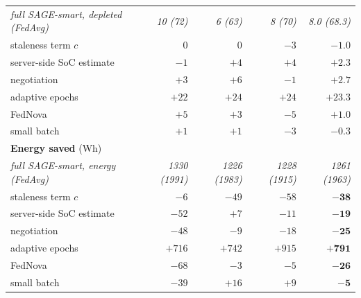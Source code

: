 \documentclass[11pt,a4paper]{article}
\begin{document}
\begin{table}[H]
\begin{tabular}{lrrrr}
\quad \emph{full SAGE-smart, depleted (FedAvg)} & \emph{10 (72)} & \emph{6 (63)} & \emph{8 (70)} & \emph{8.0 (68.3)} \\
\quad staleness term $c$        & $0$  & $0$  & $-3$  & $\mathbf{-1.0}$ \\
\quad server-side SoC estimate  & $-1$ & $+4$ & $+4$  & $\mathbf{+2.3}$ \\
\quad negotiation               & $+3$ & $+6$ & $-1$  & $\mathbf{+2.7}$ \\
\quad adaptive epochs           & $+22$ & $+24$ & $+24$ & $\mathbf{+23.3}$ \\
\quad FedNova                   & $+5$ & $+3$ & $-5$  & $\mathbf{+1.0}$ \\
\quad small batch               & $+1$ & $+1$ & $-3$  & $\mathbf{-0.3}$ \\
\midrule
\multicolumn{5}{l}{\textbf{Energy saved} (Wh)} \\
\quad \emph{full SAGE-smart, energy (FedAvg)} & \emph{1330 (1991)} & \emph{1226 (1983)} & \emph{1228 (1915)} & \emph{1261 (1963)} \\
\quad staleness term $c$        & $-6$   & $-49$  & $-58$  & $\mathbf{-38}$ \\
\quad server-side SoC estimate  & $-52$  & $+7$   & $-11$  & $\mathbf{-19}$ \\
\quad negotiation               & $-48$  & $-9$   & $-18$  & $\mathbf{-25}$ \\
\quad adaptive epochs           & $+716$ & $+742$ & $+915$ & $\mathbf{+791}$ \\
\quad FedNova                   & $-68$  & $-3$   & $-5$   & $\mathbf{-26}$ \\
\quad small batch               & $-39$  & $+16$  & $+9$   & $\mathbf{-5}$ \\
\bottomrule
\end{tabular}
\end{table}
\end{document}
